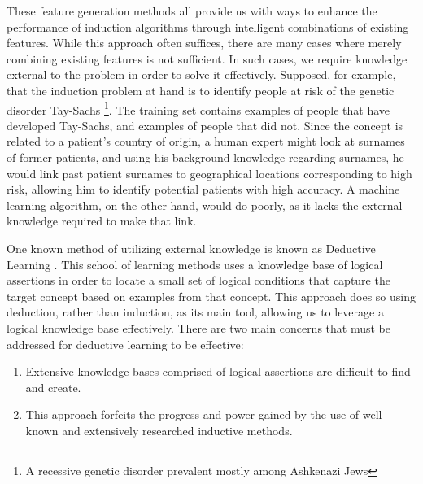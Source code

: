 \documentclass[twoside,11pt]{article}
\theoremstyle{definition}
\begin{document}
These feature generation methods all provide us with ways to enhance the performance of induction algorithms through intelligent combinations of existing features. While this approach often suffices, there are many cases where merely combining existing features is not sufficient. 
In such cases, we require knowledge external to the problem in order to solve it effectively.
Supposed, for example, that the induction problem at hand is to identify people at risk of the genetic disorder Tay-Sachs \footnote{A recessive genetic disorder prevalent mostly among Ashkenazi Jews}. The training set contains examples of people that have developed Tay-Sachs, and examples of people that did not. Since the concept is related to a patient's country of origin, a human expert might look at surnames of former patients, and using his background knowledge regarding surnames, he would link past patient surnames to geographical locations corresponding to high risk, allowing him to identify potential patients with high accuracy.
A machine learning algorithm, on the other hand, would do poorly, as it lacks the external knowledge required to make that link.

One known method of utilizing external knowledge is known as Deductive Learning \cite{mitchell1982generalization,dejong1986explanation}. This school of learning methods uses a knowledge base of logical assertions in order to locate a small set of logical conditions that capture the target concept based on examples from that concept. This approach does so using deduction, rather than induction, as its main tool, allowing us to leverage a logical knowledge base effectively.
There are two main concerns that must be addressed for deductive learning to be effective:
\begin{enumerate}
	\item Extensive knowledge bases comprised of logical assertions are difficult to find and create.
	\item This approach forfeits the progress and power gained by the use of well-known and extensively researched inductive methods.
\end{enumerate}
\end{document}
